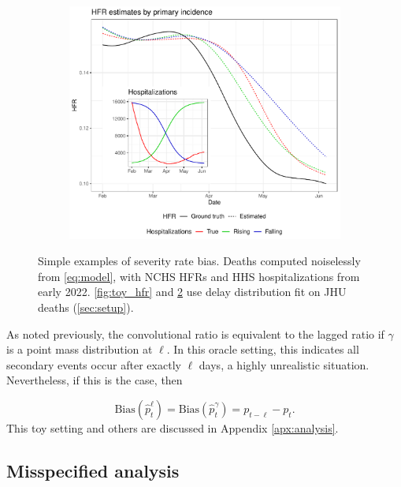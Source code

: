 \documentclass{article}
\begin{document}
\begin{figure}
\begin{subfigure}[b]{0.32\linewidth}
         \caption{}
         \label{fig:toy_delay}
     \end{subfigure}
     \begin{subfigure}[b]{0.32\linewidth}
         \centering
         \includegraphics[width=\linewidth]{Figs/Simulated/toy_chging_primary.pdf}
         \caption{}
         \label{fig:toy_primary}
     \end{subfigure}
        \caption{Simple examples of severity rate bias. Deaths computed noiselessly from \ref{eq:model}, with NCHS HFRs and HHS hospitalizations from early 2022. \ref{fig:toy_hfr} and \ref{fig:toy_primary} use delay distribution fit on JHU deaths (\ref{sec:setup}).}
        \label{fig:bias_ex_main}
\end{figure}


As noted previously, the convolutional ratio is equivalent to the lagged ratio if $\gamma$ is a point mass distribution at $\ell$. In this oracle setting, this indicates all secondary events occur after exactly $\ell$ days, a highly unrealistic situation. Nevertheless, if this is the case, then 

$$\text{Bias}(\hat{p}_t^\ell) = \text{Bias}(\hat{p}_t^\gamma) = p_{t-\ell}-p_t.$$
\noindent This toy setting and others are discussed in Appendix \ref{apx:analysis}.

\subsection{Misspecified analysis}\label{sec:misp}
\end{document}
